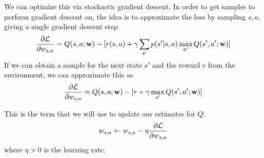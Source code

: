 \documentclass[12pt]{article}
\begin{document}
We can optimize this via stochastic gradient descent. In order to get samples to perform gradient descent on, the idea is to approximate the loss by sampling $s,a$, giving a single gradient descent step
\begin{align}\frac{\partial \mathcal{L}}{\partial w_{s,a}} = Q(s,a;\mathbf{w}) - [r(s,a) + \gamma \sum_{s'}p(s'|s, a)\max_{a'}Q(s', a'; \mathbf{w})]\end{align}
If we can obtain a sample for the next state $s'$ and the reward $r$ from the environment, we can approximate this as
\begin{align}\frac{\partial \mathcal{L}}{\partial w_{s,a}} \approx Q(s,a;\mathbf{w}) - [r + \gamma \max_{a'}Q(s', a'; \mathbf{w})]\end{align}

This is the term that we will use to update our estimates for $Q$:
\begin{align}
    w_{s,a} \leftarrow w_{s,a} - \eta\frac{\partial \mathcal{L}}{\partial w_{s,a}}
\end{align}
where $\eta>0$ is the learning rate.
\end{document}
